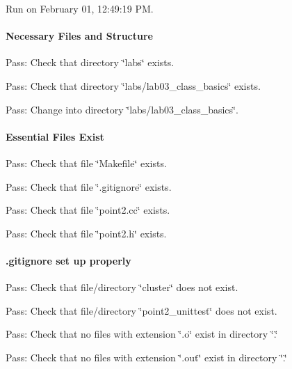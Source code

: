 Run on February 01, 12\+:49\+:19 PM.

\paragraph*{Necessary Files and Structure}


\begin{DoxyItemize}
\item Pass\+: Check that directory \char`\"{}labs\char`\"{} exists.
\item Pass\+: Check that directory \char`\"{}labs/lab03\+\_\+class\+\_\+basics\char`\"{} exists.
\item Pass\+: Change into directory \char`\"{}labs/lab03\+\_\+class\+\_\+basics\char`\"{}.
\end{DoxyItemize}

\paragraph*{Essential Files Exist}


\begin{DoxyItemize}
\item Pass\+: Check that file \char`\"{}\+Makefile\char`\"{} exists.
\item Pass\+: Check that file \char`\"{}.\+gitignore\char`\"{} exists.
\item Pass\+: Check that file \char`\"{}point2.\+cc\char`\"{} exists.
\item Pass\+: Check that file \char`\"{}point2.\+h\char`\"{} exists.
\end{DoxyItemize}

\paragraph*{.gitignore set up properly}


\begin{DoxyItemize}
\item Pass\+: Check that file/directory \char`\"{}cluster\char`\"{} does not exist.
\item Pass\+: Check that file/directory \char`\"{}point2\+\_\+unittest\char`\"{} does not exist.
\item Pass\+: Check that no files with extension \char`\"{}.\+o\char`\"{} exist in directory \char`\"{}.\char`\"{}
\item Pass\+: Check that no files with extension \char`\"{}.\+out\char`\"{} exist in directory \char`\"{}.\char`\"{}
\end{DoxyItemize}

